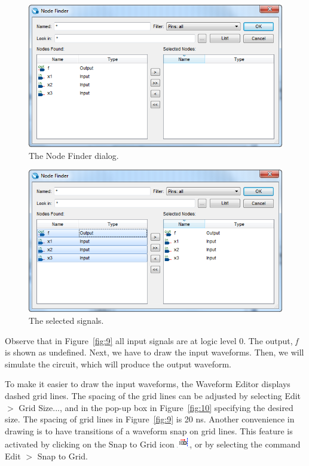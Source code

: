 \documentclass[11pt, twoside, pdftex]{article}
\begin{document}
\begin{figure}[H]
   \begin{center}
      \includegraphics[scale=0.65]{figures/figure7.png}
   \caption{The Node Finder dialog.} 
	 \label{fig:7}
	 \end{center}
\end{figure}

\begin{figure}[H]
   \begin{center}
      \includegraphics[scale=0.65]{figures/figure8.png}
   \caption{The selected signals.} 
	 \label{fig:8}
	 \end{center}
\end{figure}

Observe that in Figure~\ref{fig:9} all input signals are at logic level 0. The output, {\it f}
is shown as undefined. Next, we have to draw the input waveforms. Then, we will simulate
the circuit, which will produce the output waveform.

To make it easier to draw the input waveforms, the Waveform Editor displays dashed grid lines.
The spacing of the grid lines can be adjusted by selecting {\sf Edit $>$ Grid Size...}, and in the
pop-up box in Figure~\ref{fig:10} specifying the desired size. The spacing of grid lines in Figure~\ref{fig:9} is
20 ns. Another convenience in drawing is to have transitions of a waveform snap on 
grid lines. This feature is activated by clicking on the {\sf Snap to Grid} icon 
\hbox{\includegraphics[scale=0.7]{figures/icon1.png}}, or by selecting the command
{\sf Edit $>$ Snap to Grid}.
~\\
\end{document}
